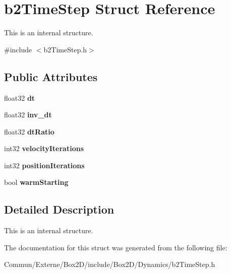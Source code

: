 \hypertarget{structb2_time_step}{}\section{b2\+Time\+Step Struct Reference}
\label{structb2_time_step}


This is an internal structure.  




{\ttfamily \#include $<$b2\+Time\+Step.\+h$>$}

\subsection*{Public Attributes}
\begin{DoxyCompactItemize}
\item 
float32 {\bfseries dt}\hypertarget{structb2_time_step_a74e20836809accba98a4445fbcb3427c}{}\label{structb2_time_step_a74e20836809accba98a4445fbcb3427c}

\item 
float32 {\bfseries inv\+\_\+dt}\hypertarget{structb2_time_step_ac2d652bde6d303149db9d0a461bc22ba}{}\label{structb2_time_step_ac2d652bde6d303149db9d0a461bc22ba}

\item 
float32 {\bfseries dt\+Ratio}\hypertarget{structb2_time_step_aa67bc8a12ffafce918d9e6a0d8d3f203}{}\label{structb2_time_step_aa67bc8a12ffafce918d9e6a0d8d3f203}

\item 
int32 {\bfseries velocity\+Iterations}\hypertarget{structb2_time_step_a9f2a0ccd8029681f254003b66f201ce1}{}\label{structb2_time_step_a9f2a0ccd8029681f254003b66f201ce1}

\item 
int32 {\bfseries position\+Iterations}\hypertarget{structb2_time_step_ab7938eec17a1a3d7961d8364e150f1be}{}\label{structb2_time_step_ab7938eec17a1a3d7961d8364e150f1be}

\item 
bool {\bfseries warm\+Starting}\hypertarget{structb2_time_step_add80f7f86c84f005ad817f0313df3f32}{}\label{structb2_time_step_add80f7f86c84f005ad817f0313df3f32}

\end{DoxyCompactItemize}


\subsection{Detailed Description}
This is an internal structure. 

The documentation for this struct was generated from the following file\+:\begin{DoxyCompactItemize}
\item 
Commun/\+Externe/\+Box2\+D/include/\+Box2\+D/\+Dynamics/b2\+Time\+Step.\+h\end{DoxyCompactItemize}
